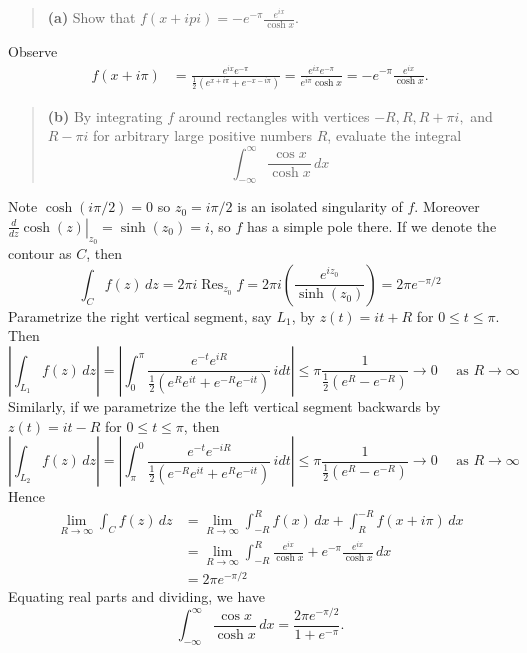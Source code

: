\documentclass{homework}
\DeclareMathOperator*{\Res}{Res}
\begin{document}
\begin{quote}
  {\bf (a)} Show that $f(x+ipi) = -e^{-\pi}\frac{e^{ix}}{\cosh x}$.
\end{quote}
\begin{solution}
  Observe
  \begin{align*}  
    f(x+i\pi) 
    &= \frac{e^{ix} e^{-\pi}}{\frac 12(e^{x+i\pi}+e^{-x-i\pi})} = \frac{e^{ix} e^{-\pi}}{e^{i\pi}\cosh x} = -e^{-\pi}\frac{e^{ix}}{\cosh x}.
  \end{align*}
\end{solution}
\begin{quote}
  {\bf (b)} By integrating $f$ around rectangles with vertices $-R,R,R+\pi i,$ and $R-\pi i$ for arbitrary large positive numbers $R$, evaluate the integral 
  $$
    \int_{-\infty}^\infty \frac{\cos x}{\cosh x}\,dx
  $$
\end{quote}
\begin{solution}
  Note $\cosh(i\pi/2) = 0$ so $z_0 = i\pi/2$ is an isolated singularity of $f$.  Moreover $\left.\frac d{dz}\cosh(z)\right|_{z_0} = \sinh(z_0) = i$, so $f$ has a simple pole there. If we denote the contour as $C$, then 
  $$
    \int_C f(z)\,dz = 2\pi i \Res_{z_0}f = 2\pi i\left( \frac{e^{iz_0}}{\sinh(z_0)} \right) = 2\pi e^{-\pi/2}
  $$
  Parametrize the right vertical segment, say $L_1$, by $z(t) = it + R$ for $0\le t\le \pi$.  Then
  $$
    \left|\int_{L_1} f(z)\,dz\right|  
    = \left|\int_0^\pi \frac{e^{-t}e^{iR}}{\frac 12(e^Re^{it} + e^{-R}e^{-it})}\,idt\right|
    \le \pi \frac{1}{\frac 12(e^R - e^{-R})} \to 0\quad\text{ as }R\to\infty
  $$
  Similarly, if we parametrize the the left vertical segment backwards by $z(t) = it -R$ for $0\le t\le \pi$, then
  $$
    \left|\int_{L_2} f(z)\,dz\right|  
    = \left|\int_\pi^0 \frac{e^{-t}e^{-iR}}{\frac 12(e^{-R}e^{it} + e^{R}e^{-it})}\,idt\right|
    \le \pi \frac{1}{\frac 12(e^R - e^{-R})} \to 0\quad\text{ as }R\to\infty
  $$
  Hence
  \begin{align*}
    \lim_{R\to\infty} \int_C f(z)\,dz 
    &= \lim_{R\to\infty} \int_{-R}^Rf(x)\,dx + \int_{R}^{-R} f(x+i\pi)\,dx\\
    &= \lim_{R\to\infty} \int_{-R}^R \frac{e^{ix}}{\cosh x} + e^{-\pi} \frac{e^{ix}}{\cosh x}\,dx\\
    &= 2\pi e^{-\pi/2}
  \end{align*}
  Equating real parts and dividing, we have
  $$
    \int_{-\infty}^\infty \frac{\cos x}{\cosh x}\,dx = \frac{2\pi e^{-\pi/2}}{1 + e^{-\pi}}.
  $$

\end{solution}


\end{document}
